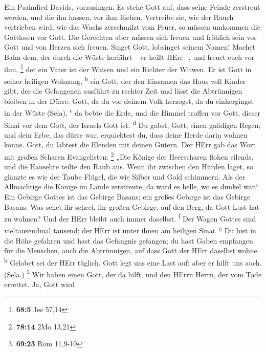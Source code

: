  Ein Psalmlied Davids, vorzusingen.  Es
stehe Gott auf, dass seine Feinde zerstreut werden, und die ihn hassen,
vor ihm fliehen.  Vertreibe sie, wie der Rauch vertrieben
wird; wie das Wachs zerschmilzt vom Feuer, so müssen umkommen die
Gottlosen vor Gott.  Die Gerechten aber müssen sich freuen
und fröhlich sein vor Gott und von Herzen sich freuen. 
Singet Gott, lobsinget seinem Namen! Machet Bahn dem, der durch die
Wüste herfährt -- er heißt HErr --, und freuet euch vor ihm, \footnote{\textbf{68:5}
  Jes 57,14}  der ein Vater ist der Waisen und ein Richter
der Witwen. Er ist Gott in seiner heiligen Wohnung, \textsuperscript{b}
 ein Gott, der den Einsamen das Haus voll Kinder gibt, der
die Gefangenen ausführt zu rechter Zeit und lässt die Abtrünnigen
bleiben in der Dürre.  Gott, da du vor deinem Volk
herzogst, da du einhergingst in der Wüste (Sela), \textsuperscript{c}
 da bebte die Erde, und die Himmel troffen vor Gott,
dieser Sinai vor dem Gott, der Israels Gott ist. \textsuperscript{d}
 Du gabst, Gott, einen gnädigen Regen; und dein Erbe, das
dürre war, erquicktest du,  dass deine Herde darin wohnen
könne. Gott, du labtest die Elenden mit deinen Gütern. 
Der HErr gab das Wort mit großen Scharen Evangelisten: \footnote{\textbf{78:14}
  2Mo 13,21}  „Die Könige der Heerscharen flohen eilends,
und die Hausehre teilte den Raub aus.  Wenn ihr zwischen
den Hürden laget, so glänzte es wie der Taube Flügel, die wie Silber und
Gold schimmern.  Als der Allmächtige die Könige im Lande
zerstreute, da ward es helle, wo es dunkel war.``  Ein
Gebirge Gottes ist das Gebirge Basans; ein großes Gebirge ist das
Gebirge Basans.  Was sehet ihr scheel, ihr großen
Gebirge, auf den Berg, da Gott Lust hat zu wohnen? Und der HErr bleibt
auch immer daselbst. \textsuperscript{f}  Der Wagen
Gottes sind vieltausendmal tausend; der HErr ist unter ihnen am heiligen
Sinai. \textsuperscript{g}  Du bist in die Höhe gefahren
und hast das Gefängnis gefangen; du hast Gaben empfangen für die
Menschen, auch die Abtrünnigen, auf dass Gott der HErr daselbst wohne.
\textsuperscript{h}  Gelobet sei der HErr täglich. Gott
legt uns eine Last auf; aber er hilft uns auch. (Sela.) \footnote{\textbf{69:23}
  Röm 11,9-10}  Wir haben einen Gott, der da hilft, und
den HErrn Herrn, der vom Tode errettet.  Ja, Gott wird

